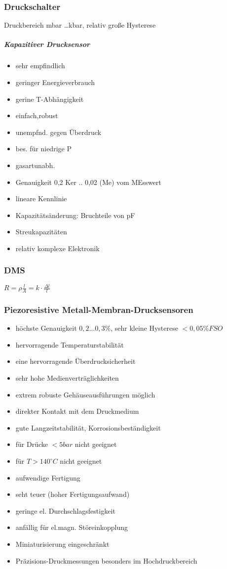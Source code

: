 \documentclass[a4paper]{scrartcl}
\begin{document}
\subsubsection{Druckschalter}
Druckbereich mbar \dots kbar, relativ große Hysterese

\subparagraph{Kapazitiver Drucksensor}
\begin{itemize}
\item sehr empfindlich
\item geringer Energieverbrauch
\item gerine T-Abhängigkeit
\item einfach,robust
\item unempfnd. gegen Überdruck
\item bes. für niedrige P
\item gasartunabh.
\item Genauigkeit 0,2 Ker .. 0,02 (Me) vom MEsswert
\item lineare Kennlinie
\item Kapazitätsänderung: Bruchteile von pF
\item Streukapazitäten
\item relativ komplexe Elektronik

\end{itemize}

\subsubsection{DMS} $R = \rho \frac{l}{A}  = k \cdot \frac{\Delta l}{l}$

\subsubsection{Piezoresistive Metall-Membran-Drucksensoren}
\begin{itemize}
\item höchste Genauigkeit $0,2 \dots 0,3 \%$, sehr kleine Hysterese $< 0,05 \% FSO$
\item hervorragende Temperaturstabilität
\item eine hervorragende Überdrucksicherheit
\item sehr hohe Medienverträglichkeiten
\item extrem robuste Gehäuseausführungen möglich
\item direkter Kontakt mit dem Druckmedium
\item gute Langzeitstabilität, Korrosionsbeständigkeit
\item für Drücke $< 5 bar$ nicht geeignet
\item für $T > 140^\circ C$ nicht geeignet 
\item aufwendige Fertigung 
\item seht teuer (hoher Fertigungsaufwand)
\item geringe el. Durchschlagsfestigkeit
\item anfällig für el.magn. Störeinkopplung
\item Miniaturisierung eingeschränkt
\item Präzisions-Druckmessungen besonders im Hochdruckbereich
\end{itemize}
\end{document}
